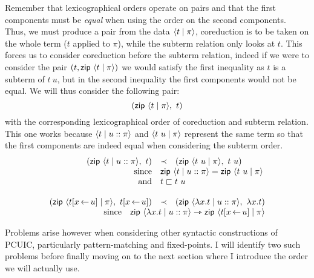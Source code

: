 Remember that lexicographical orders operate on pairs and that the first
components must be \emph{equal} when using the order on the second components.
Thus, we must produce a pair from the data \(\langle t \mid \pi \rangle\), coreduction
is to be taken on the whole term (\(t\) applied to \(\pi\)), while the subterm
relation only looks at \(t\).
This forces us to consider coreduction before the subterm relation, indeed if we
were to consider the pair \((t, \mathsf{zip}\ \langle t \mid \pi \rangle)\) we would satisfy the
first inequality as \(t\) is a subterm of \(t\ u\), but in the second inequality
the first components would not be equal.
We will thus consider the following pair:
\[
  (\mathsf{zip}\ \langle t \mid \pi \rangle,\ t)
\]
with the corresponding lexicographical order of coreduction and subterm
relation. This one works because \(\langle t \mid u :: \pi \rangle\) and
\(\langle t\ u \mid \pi \rangle\) represent the same term so that the first components
are indeed equal when considering the subterm order.
\[
  \begin{array}{rcl}
    (\zip\ \dpair{t \mid u :: \pi},\ t) &\prec&
    (\zip\ \dpair{t\ u \mid \pi},\ t\ u) \\
    \text{since} &
    \multicolumn{2}{l}{
      \zip\ \dpair{t \mid u :: \pi} = \zip\ \dpair{t\ u \mid \pi}
    } \\
    \text{and} &
    \multicolumn{2}{l}{t \sqsubset t\ u} \\
    \\
    (\zip\ \dpair{t[x \sto u] \mid \pi},\ t[x \sto u]) &\prec&
    (\zip\ \dpair{\lambda x.t \mid u :: \pi},\ \lambda x.t) \\
    \multicolumn{3}{r}{
      \text{since} \quad
      \zip\ \dpair{\lambda x.t \mid u :: \pi} \red
      \zip\ \dpair{t[x \sto u] \mid \pi}
    }
  \end{array}
\]

Problems arise however when considering other syntactic constructions of
\acrshort{PCUIC}, particularly pattern-matching and fixed-points.
I will identify two such problems before finally moving on to the next section
where I introduce the order we will actually use.

%
